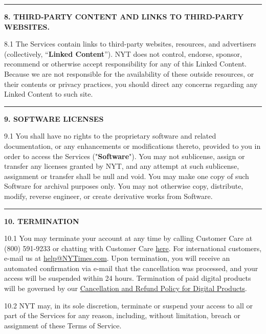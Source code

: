 \begin{center}\rule{0.5\linewidth}{\linethickness}\end{center}

\textbf{8. THIRD-PARTY CONTENT AND LINKS TO THIRD-PARTY WEBSITES.}

8.1 The Services contain links to third-party websites, resources, and
advertisers (collectively, ``\textbf{Linked Content}''). NYT does not
control, endorse, sponsor, recommend or otherwise accept responsibility
for any of this Linked Content. Because we are not responsible for the
availability of these outside resources, or their contents or privacy
practices, you should direct any concerns regarding any Linked Content
to such site.

\begin{center}\rule{0.5\linewidth}{\linethickness}\end{center}

\textbf{9. SOFTWARE LICENSES}

9.1 You shall have no rights to the proprietary software and related
documentation, or any enhancements or modifications thereto, provided to
you in order to access the Services ("\textbf{Software}"). You may not
sublicense, assign or transfer any licenses granted by NYT, and any
attempt at such sublicense, assignment or transfer shall be null and
void. You may make one copy of such Software for archival purposes only.
You may not otherwise copy, distribute, modify, reverse engineer, or
create derivative works from Software.

\begin{center}\rule{0.5\linewidth}{\linethickness}\end{center}

\textbf{10. TERMINATION}

10.1 You may terminate your account at any time by calling Customer Care
at (800) 591-9233 or chatting with Customer Care
\href{https://help.nytimes3xbfgragh.onion/hc/en-us/articles/115015385887-Contact-Us\#care}{here}.
For international customers, e-mail us at
\href{mailto:help@NYTimes.com}{help@NYTimes.com}. Upon termination, you
will receive an automated confirmation via e-mail that the cancellation
was processed, and your access will be suspended within 24 hours.
Termination of paid digital products will be governed by our
\href{http://www.nytimes3xbfgragh.onion/content/help/rights/sale/terms-of-sale.html\#cancel}{Cancellation
and Refund Policy for Digital Products}.

10.2 NYT may, in its sole discretion, terminate or suspend your access
to all or part of the Services for any reason, including, without
limitation, breach or assignment of these Terms of Service.

